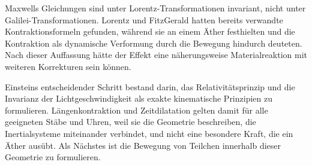 \begin{classroomqa}\end{classroomqa}

Maxwells Gleichungen sind unter Lorentz-Transformationen invariant, nicht unter Galilei-Transformationen. Lorentz und FitzGerald hatten bereits verwandte Kontraktionsformeln gefunden, während sie an einem Äther festhielten und die Kontraktion als dynamische Verformung durch die Bewegung hindurch deuteten. Nach dieser Auffassung hätte der Effekt eine näherungsweise Materialreaktion mit weiteren Korrekturen sein können.

Einsteins entscheidender Schritt bestand darin, das Relativitätsprinzip und die Invarianz der Lichtgeschwindigkeit als exakte kinematische Prinzipien zu formulieren. Längenkontraktion und Zeitdilatation gelten damit für alle geeigneten Stäbe und Uhren, weil sie die Geometrie beschreiben, die Inertialsysteme miteinander verbindet, und nicht eine besondere Kraft, die ein Äther ausübt. Als Nächstes ist die Bewegung von Teilchen innerhalb dieser Geometrie zu formulieren.
